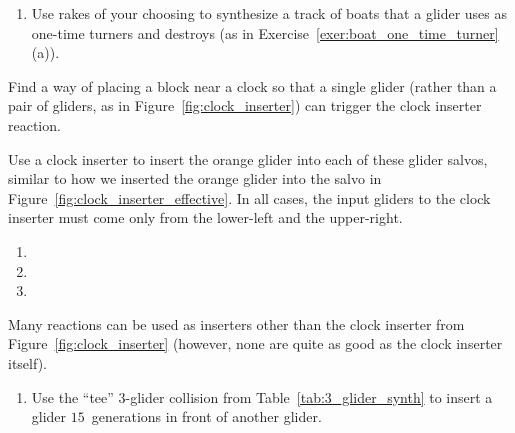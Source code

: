 \begin{multicols}{2}
\begin{problem}
\begin{enumerate}[label=(\alph*)]
		\item Use rakes of your choosing to synthesize a track of boats that a glider uses as one-time turners and destroys (as in Exercise~\ref{exer:boat_one_time_turner}(a)).
	\end{enumerate}
\end{problem}

\mfilbreak

\begin{problem}\label{exer:clock_inserter_block}
	Find a way of placing a block near a clock so that a single glider (rather than a pair of gliders, as in Figure~\ref{fig:clock_inserter}) can trigger the clock inserter reaction.
\end{problem}

\mfilbreak

\begin{problem}\label{exer:clock_inserter_use}
	Use a clock inserter to insert the orange glider into each of these glider salvos, similar to how we inserted the orange glider into the salvo in Figure~\ref{fig:clock_inserter_effective}. In all cases, the input gliders to the clock inserter must come only from the lower-left and the upper-right.
	\vspace*{-0.3cm}\begin{multicols}{2}
		\begin{enumerate}[label=(\alph*)]
			\item {}
			
			\item {}
			
			\item {}
		\end{enumerate}
	\end{multicols}
\end{problem}

\mfilbreak

\begin{problem}\label{exer:other_inserters}
	Many reactions can be used as inserters other than the clock inserter from Figure~\ref{fig:clock_inserter} (however, none are quite as good as the clock inserter itself).
	\begin{enumerate}[label=(\alph*)]
		\item Use the ``tee'' $3$-glider collision from Table~\ref{tab:3_glider_synth} to insert a glider $15$~generations in front of another glider.
		

\end{enumerate}
\end{problem}
\end{multicols}
